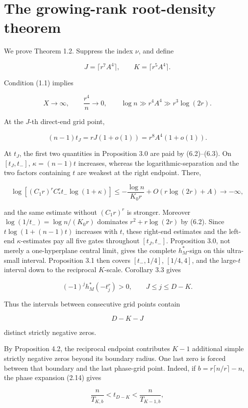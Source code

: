 \documentclass[10pt]{article}
\begin{document}
\section{The growing-rank root-density theorem}


We prove Theorem 1.2.  Suppress the index $\nu$, and define

\[
 J=\lceil r^7A^4\rceil,
 \qquad K=\lceil r^5A^4\rceil. \tag{6.1}
\]

Condition (1.1) implies

\[
 X\to\infty,\qquad \frac{r^4}{n}\to0,\qquad
 \log n\gg r^4A^4\gg r^3\log(2r). \tag{6.2}
\]

At the $J$-th direct-end grid point,

\[
 (n-1)t_J=rJ(1+o(1))=r^8A^4(1+o(1)). \tag{6.3}
\]

At $t_J$, the first two quantities in Proposition 3.0 are paid by
(6.2)--(6.3).  On $[t_J,t_-]$, $\kappa=(n-1)t$ increases, whereas the
logarithmic-separation and the two factors containing $t$ are weakest at the
right endpoint.  There,

\[
 \log\!\left[(C_1r)^rC_*^r t_-\log(1+\kappa)\right]
 \le-\frac{\log n}{K_0r}+O(r\log(2r)+A)\longrightarrow-\infty, \tag{6.3a}
\]

and the same estimate without $(C_1r)^r$ is stronger.  Moreover
$\log(1/t_-)=\log n/(K_0r)$ dominates
$r^2+r\log(2r)$ by (6.2).  Since
$t\log(1+(n-1)t)$ increases with $t$, these right-end estimates and the
left-end $\kappa$-estimates pay all five gates throughout
$[t_J,t_-]$.  Proposition 3.0, not merely a one-hyperplane central limit,
gives the complete $h_M^*$-sign on this ultra-small interval.  Proposition
3.1 then covers
$[t_-,1/4]$, $[1/4,4]$, and the large-$t$ interval down to the reciprocal
$K$-scale.  Corollary 3.3 gives

\[
 (-1)^jh_M^*(-t_j^r)>0,
 \qquad J\le j\le D-K. \tag{6.4}
\]

Thus the intervals between consecutive grid points contain

\[
 D-K-J \tag{6.5}
\]

distinct strictly negative zeros.

By Proposition 4.2, the reciprocal endpoint contributes $K-1$ additional
simple strictly negative zeros beyond its boundary radius.  One last zero is
forced between that boundary and the last phase-grid point.  Indeed, if
$b=r\lceil n/r\rceil-n$, the phase expansion (2.14) gives

\[
 \frac n{T_{K,b}}<t_{D-K}<\frac n{T_{K-1,b}}, \tag{6.6}
\]
\end{document}
